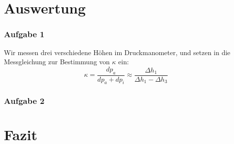 \documentclass[%
   final,      %
   paper=a4, paper=portrait, pagesize=auto, %
   fontsize=11pt, %
   ngerman, %
 ]{scrartcl} %
\begin{document}
\section{Auswertung}
\subsubsection{Aufgabe 1}
Wir messen drei verschiedene Höhen im Druckmanometer, und setzen in die Messgleichung zur Bestimmung von $\kappa$ ein:
\begin{equation}
\kappa = \frac{dp_a}{dp_a + dp_i}\approx \frac{\Delta h_1}{\Delta h_1 - \Delta h_3}
\end{equation}
\subsubsection{Aufgabe 2}
\section{Fazit}
\end{document}
